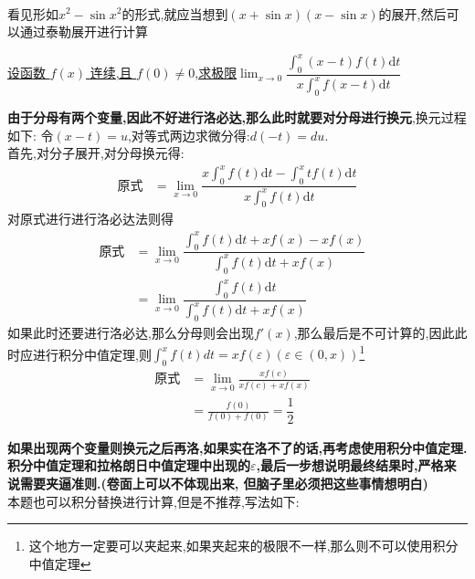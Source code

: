 \documentclass[8pt a4paper, oneside, UTF8]{ctexbook}
\begin{document}
\begin{sloppypar}
\begin{solution}
\begin{align*}
        \end{align*}
    \end{solution}
    \begin{note}
        看见形如$x^2-\sin x^2$的形式,就应当想到$(x+\sin x)(x-\sin x)$的展开,然后可以通过泰勒展开进行计算
    \end{note}
    \begin{problem}
        \uline{设函数 $f(x)$ 连续,且 $f(0)\neq0$,求极限}$\operatorname*{lim}_{x\to0}{\dfrac{\int_{0}^{x}\left(x-t\right)f\left(t\right)\mathrm{d}t}{x\int_{0}^{x}f\left(x-t\right)\mathrm{d}t}}$
    \end{problem}
    \begin{solution}
        \textbf{由于分母有两个变量,因此不好进行洛必达,那么此时就要对分母进行换元},换元过程如下:
        令$(x-t)=u$,对等式两边求微分得:$d(-t)=du$.\\
        首先,对分子展开,对分母换元得:
        \begin{align*}
            \text{原式} & = \lim_{x\to0}\dfrac{x\int_{0}^{x}f(t)\mathrm{d}t-\int_{0}^{x}tf\left(t\right)\mathrm{d}t}{x\int_{0}^{x}f(t)\mathrm{d}t} 
        \end{align*}
        对原式进行进行洛必达法则得
        \begin{align*}
            \text{原式} & = \lim_{x\to0}\dfrac{\int_0^xf(t)\mathrm{d}t+xf(x)-xf(x)}{\int_0^xf(t)\mathrm{d}t+xf(x)} & \\
            & =  \lim\limits_{x\to0}\dfrac{\int_0^xf(t)\mathrm{d}t}{\int_0^xf(t)\mathrm{d}t+xf(x)}
        \end{align*}
        如果此时还要进行洛必达,那么分母则会出现$f'(x)$,那么最后是不可计算的,因此此时应进行积分中值定理,则$\int _0 ^x f(t)dt=xf(\varepsilon) (\varepsilon \in (0,x))$\footnote{这个地方一定要可以夹起来,如果夹起来的极限不一样,那么则不可以使用积分中值定理}
        \begin{align*}
            \text{原式} & = \lim_{x\to0}\frac{xf\left(c\right)}{xf\left(c\right)+xf\left(x\right)} & \\
            & = \frac{f(0)}{f(0)+f(0)}=\dfrac12
        \end{align*}
    \end{solution}
    \begin{note}
        \textbf{如果出现两个变量则换元之后再洛,如果实在洛不了的话,再考虑使用积分中值定理.积分中值定理和拉格朗日中值定理中出现的$\varepsilon$,最后一步想说明最终结果时,严格来说需要夹逼准则.(卷面上可以不体现出来, 但脑子里必须把这些事情想明白)}\\
        本题也可以积分替换进行计算,但是不推荐,写法如下:

\end{note}
\end{sloppypar}
\end{document}
